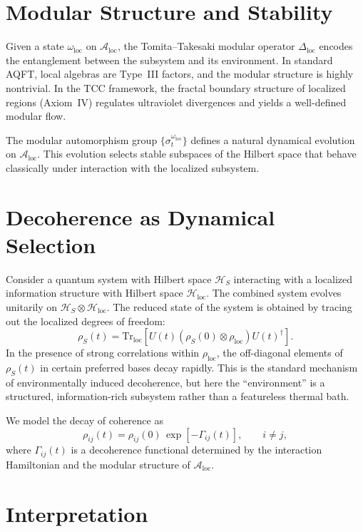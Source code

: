 \documentclass[12pt,openany]{book}
\theoremstyle{plain}
\theoremstyle{definition}
\theoremstyle{remark}
\begin{document}
\section{Modular Structure and Stability}

Given a state $\omega_{\mathrm{loc}}$ on $\mathcal{A}_{\mathrm{loc}}$, the
Tomita--Takesaki modular operator $\Delta_{\mathrm{loc}}$ encodes the
entanglement between the subsystem and its environment. In standard AQFT,
local algebras are Type~III factors, and the modular structure is highly
nontrivial. In the TCC framework, the fractal boundary structure of localized
regions (Axiom~IV) regulates ultraviolet divergences and yields a well-defined
modular flow.

The modular automorphism group $\{\sigma_{t}^{\omega_{\mathrm{loc}}}\}$ defines
a natural dynamical evolution on $\mathcal{A}_{\mathrm{loc}}$. This evolution
selects stable subspaces of the Hilbert space that behave classically under
interaction with the localized subsystem.

\section{Decoherence as Dynamical Selection}

Consider a quantum system with Hilbert space $\mathcal{H}_{S}$ interacting with
a localized information structure with Hilbert space $\mathcal{H}_{\mathrm{loc}}$.
The combined system evolves unitarily on
$\mathcal{H}_{S} \otimes \mathcal{H}_{\mathrm{loc}}$. The reduced state of the
system is obtained by tracing out the localized degrees of freedom:
\[
\rho_{S}(t)
  = \mathrm{Tr}_{\mathrm{loc}}
    \left[ U(t)
      \left( \rho_{S}(0) \otimes \rho_{\mathrm{loc}} \right)
      U(t)^{\dagger}
    \right].
\]
In the presence of strong correlations within $\rho_{\mathrm{loc}}$, the
off-diagonal elements of $\rho_{S}(t)$ in certain preferred bases decay
rapidly. This is the standard mechanism of environmentally induced decoherence,
but here the ``environment'' is a structured, information-rich subsystem rather
than a featureless thermal bath.

We model the decay of coherence as
\[
\rho_{ij}(t)
  = \rho_{ij}(0)\,
    \exp\!\left[-\Gamma_{ij}(t)\right],
\qquad i \neq j,
\]
where $\Gamma_{ij}(t)$ is a decoherence functional determined by the
interaction Hamiltonian and the modular structure of
$\mathcal{A}_{\mathrm{loc}}$.

\section{Interpretation}
\end{document}
